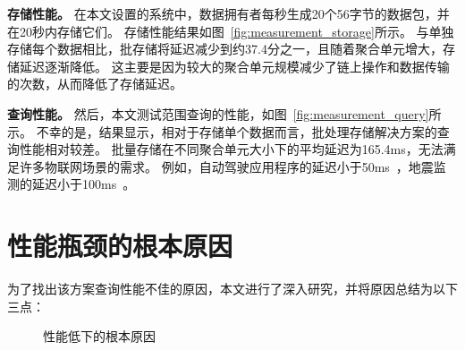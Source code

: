 \textbf{存储性能。}
在本文设置的系统中，数据拥有者每秒生成20个56字节的数据包，并在20秒内存储它们。
存储性能结果如图~\autoref{fig:measurement_storage}所示。
与单独存储每个数据相比，批存储将延迟减少到约37.4分之一，且随着聚合单元增大，存储延迟逐渐降低。
这主要是因为较大的聚合单元规模减少了链上操作和数据传输的次数，从而降低了存储延迟。

\textbf{查询性能。}
然后，本文测试范围查询的性能，如图~\autoref{fig:measurement_query}所示。
不幸的是，结果显示，相对于存储单个数据而言，批处理存储解决方案的查询性能相对较差。
批量存储在不同聚合单元大小下的平均延迟为165.4ms，无法满足许多物联网场景的需求。
例如，自动驾驶应用程序的延迟小于50ms~\cite{caesar2020nuscenes}，地震监测的延迟小于100ms~\cite{bhatia2023artificial}。

\section{性能瓶颈的根本原因}
为了找出该方案查询性能不佳的原因，本文进行了深入研究，并将原因总结为以下三点：

\begin{figure*}[t]
    \centering
    \begin{minipage}{1\linewidth}
	    \centering
        \hfill
        \hfill
        \caption{性能低下的根本原因} 
    \end{minipage}
\end{figure*}

